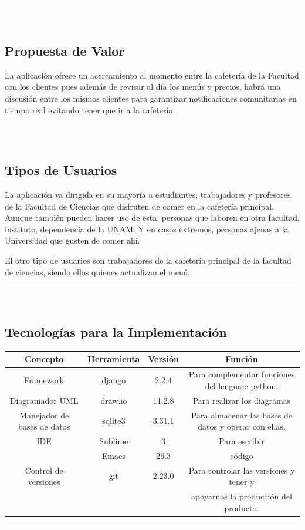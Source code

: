 \documentclass{article}
\begin{document}
\rule{0.8\textwidth}{.8pt}\\

\subsection*{Propuesta de Valor}

La aplicación ofrece un acercamiento al momento entre la cafetería de la
Facultad con los clientes pues además de revisar al día los menús y precios,
habrá una discusión entre los mismos clientes para garantizar notificaciones
comunitarias en tiempo real evitando tener que ir a la cafetería.

\rule{0.8\textwidth}{.8pt}\\

\subsection*{Tipos de Usuarios}

La aplicación va dirigida en su mayoría a estudiantes, trabajadores y profesores
de la Facultad de Ciencias que disfruten de comer en la cafetería principal.
Aunque también pueden hacer uso de esta, personas que laboren en otra facultad,
instituto, dependencia de la UNAM. Y en casos extremos, personas ajenas a la
Universidad que gusten de comer ahí. 

El otro tipo de usuarios son trabajadores de la cafetería principal de la
facultad de ciencias, siendo ellos quienes actualizan el menú.

\rule{0.8\textwidth}{.8pt}\\

\subsection*{Tecnologías para la Implementación}

\begin{center}
  \begin{tabular}{| c | c | c | c | } \hline
    Concepto & Herramienta & Versión & Función \\\hline
    Framework & django & 2.2.4 & Para complementar funciones del lenguaje python. \\\hline
    Diagramador UML & draw.io & 11.2.8 &  Para realizar los diagramas \\\hline
    Manejador de bases de datos & sqlite3 & 3.31.1 & Para almacenar las bases de
    datos y operar con ellas. \\\hline
    IDE & Sublime & 3 & Para escribir \\
    & Emacs & 26.3 & código \\\hline
    Control de versiones & git & 2.23.0 & Para controlar las versiones y tener y \\
    & & & apoyarnos la producción del producto. \\ \hline
  \end{tabular}
\end{center}

\rule{0.8\textwidth}{.8pt}\\
\end{document}
